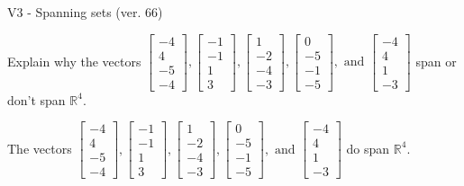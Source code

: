 \begin{exercise}
  \begin{exerciseTitle}V3 - Spanning sets (ver. 66)\end{exerciseTitle}
  \begin{exerciseStatement}
    Explain why the vectors \(\left[\begin{array}{r}
-4 \\
4 \\
-5 \\
-4
\end{array}\right] , \left[\begin{array}{r}
-1 \\
-1 \\
1 \\
3
\end{array}\right] , \left[\begin{array}{r}
1 \\
-2 \\
-4 \\
-3
\end{array}\right] , \left[\begin{array}{r}
0 \\
-5 \\
-1 \\
-5
\end{array}\right] , \text{ and } \left[\begin{array}{r}
-4 \\
4 \\
1 \\
-3
\end{array}\right]\) span or don't span \(\mathbb{R}^4\). 
	


  \end{exerciseStatement}
  \begin{exerciseAnswer}
   The vectors \(\left[\begin{array}{r}
-4 \\
4 \\
-5 \\
-4
\end{array}\right] , \left[\begin{array}{r}
-1 \\
-1 \\
1 \\
3
\end{array}\right] , \left[\begin{array}{r}
1 \\
-2 \\
-4 \\
-3
\end{array}\right] , \left[\begin{array}{r}
0 \\
-5 \\
-1 \\
-5
\end{array}\right] , \text{ and } \left[\begin{array}{r}
-4 \\
4 \\
1 \\
-3
\end{array}\right]\) 
  	 do  
	span \(\mathbb{R}^4\).
  



\end{exerciseAnswer}
\end{exercise}
